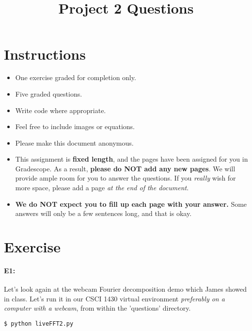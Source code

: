 \date{}

\title{\vspace{-1cm}Project 2 Questions}



\maketitle
\vspace{-3cm}
\thispagestyle{fancy}

\section*{Instructions}
\begin{itemize}
  \item One exercise graded for completion only.
  \item Five graded questions.
  \item Write code where appropriate.
  \item Feel free to include images or equations.
  \item Please make this document anonymous.
  \item This assignment is \textbf{fixed length}, and the pages have been assigned for you in Gradescope. As a result, \textbf{please do NOT add any new pages}. We will provide ample room for you to answer the questions. If you \emph{really} wish for more space, please add a page \emph{at the end of the document}.
  \item \textbf{We do NOT expect you to fill up each page with your answer.} Some answers will only be a few sentences long, and that is okay.
\end{itemize}


\section*{Exercise}

\paragraph{E1:} Let's look again at the webcam Fourier decomposition demo which James showed in class. Let's run it in our CSCI 1430 virtual environment \emph{preferably on a computer with a webcam}, from within the 'questions' directory.

\begin{verbatim}
$ python liveFFT2.py
\end{verbatim}


